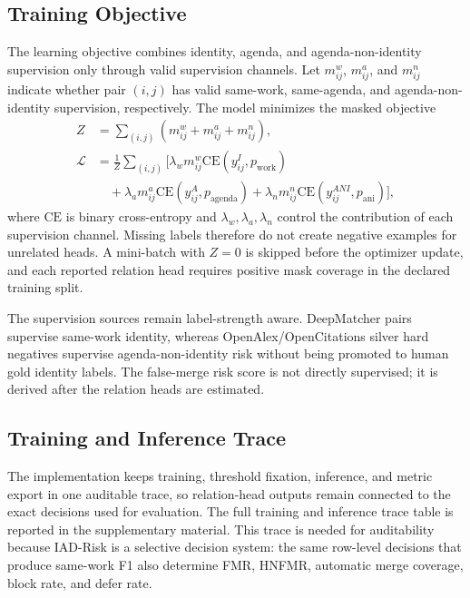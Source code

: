 \documentclass[11pt]{article}
\begin{document}
\subsection{Training Objective}

The learning objective combines identity, agenda, and agenda-non-identity supervision only through valid supervision channels. Let $m^w_{ij}$, $m^a_{ij}$, and $m^n_{ij}$ indicate whether pair $(i,j)$ has valid same-work, same-agenda, and agenda-non-identity supervision, respectively. The model minimizes the masked objective
\[
\begin{aligned}
Z &= \sum_{(i,j)}(m^w_{ij}+m^a_{ij}+m^n_{ij}),\\
\mathcal{L} &= \frac{1}{Z}\sum_{(i,j)}\bigl[
\lambda_w m^w_{ij}\mathrm{CE}(y^I_{ij}, p_{\mathrm{work}})\\
&\quad + \lambda_a m^a_{ij}\mathrm{CE}(y^A_{ij}, p_{\mathrm{agenda}})
+ \lambda_n m^n_{ij}\mathrm{CE}(y^{ANI}_{ij}, p_{\mathrm{ani}})
\bigr],
\end{aligned}
\]
where $\mathrm{CE}$ is binary cross-entropy and $\lambda_w,\lambda_a,\lambda_n$ control the contribution of each supervision channel. Missing labels therefore do not create negative examples for unrelated heads. A mini-batch with $Z=0$ is skipped before the optimizer update, and each reported relation head requires positive mask coverage in the declared training split.

The supervision sources remain label-strength aware. DeepMatcher pairs supervise same-work identity, whereas OpenAlex/OpenCitations silver hard negatives supervise agenda-non-identity risk without being promoted to human gold identity labels. The false-merge risk score is not directly supervised; it is derived after the relation heads are estimated.

\subsection{Training and Inference Trace}

The implementation keeps training, threshold fixation, inference, and metric export in one auditable trace, so relation-head outputs remain connected to the exact decisions used for evaluation. The full training and inference trace table is reported in the supplementary material. This trace is needed for auditability because IAD-Risk is a selective decision system: the same row-level decisions that produce same-work F1 also determine FMR, HNFMR, automatic merge coverage, block rate, and defer rate.
\end{document}
